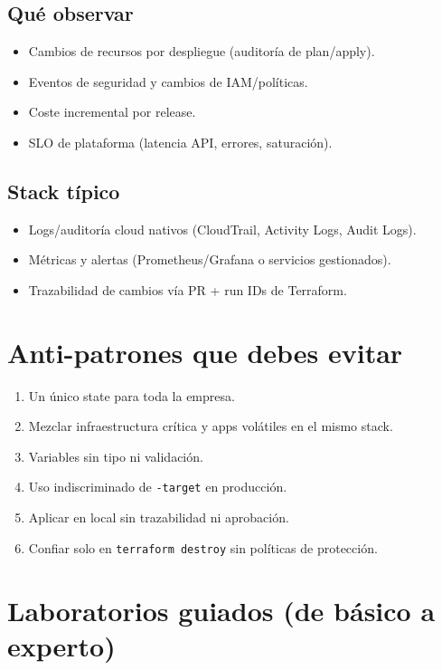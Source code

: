 \documentclass[12pt,a4paper]{article}
\begin{document}
\subsection{Qué observar}
\begin{itemize}
		\item Cambios de recursos por despliegue (auditoría de plan/apply).
		\item Eventos de seguridad y cambios de IAM/políticas.
		\item Coste incremental por release.
		\item SLO de plataforma (latencia API, errores, saturación).
\end{itemize}

\subsection{Stack típico}
\begin{itemize}
		\item Logs/auditoría cloud nativos (CloudTrail, Activity Logs, Audit Logs).
		\item Métricas y alertas (Prometheus/Grafana o servicios gestionados).
		\item Trazabilidad de cambios vía PR + run IDs de Terraform.
\end{itemize}

\section{Anti-patrones que debes evitar}

\begin{enumerate}
		\item Un único state para toda la empresa.
		\item Mezclar infraestructura crítica y apps volátiles en el mismo stack.
		\item Variables sin tipo ni validación.
		\item Uso indiscriminado de \texttt{-target} en producción.
		\item Aplicar en local sin trazabilidad ni aprobación.
		\item Confiar solo en \texttt{terraform destroy} sin políticas de protección.
\end{enumerate}

\section{Laboratorios guiados (de básico a experto)}
\end{document}
